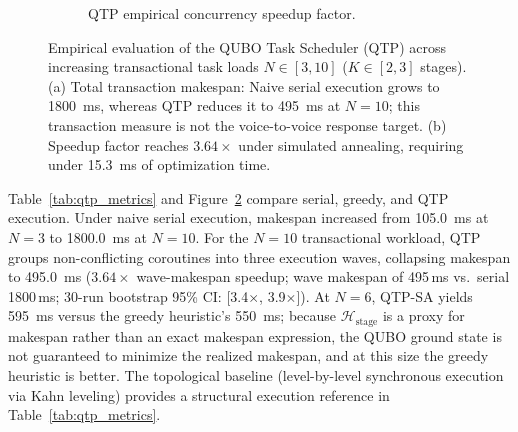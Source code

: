 \documentclass[review,12pt,times,authoryear]{elsarticle}
\theoremstyle{definition}
\begin{document}
\begin{figure}[t]
\begin{subfigure}[t]{0.48\textwidth}
\caption{QTP empirical concurrency speedup factor.}
\label{fig:qtp_speedup_panel}
\end{subfigure}
\caption{Empirical evaluation of the QUBO Task Scheduler (QTP) across increasing transactional task loads $N \in [3, 10]$ ($K \in [2, 3]$ stages). (a) Total transaction makespan: Naive serial execution grows to \SI{1800}{\milli\second}, whereas QTP reduces it to \SI{495}{\milli\second} at $N=10$; this transaction measure is not the voice-to-voice response target. (b) Speedup factor reaches $3.64\times$ under simulated annealing, requiring under \SI{15.3}{\milli\second} of optimization time.}
\label{fig:qtp_eval}
\end{figure}

Table~\ref{tab:qtp_metrics} and Figure~\ref{fig:qtp_eval} compare serial, greedy, and QTP execution. Under naive serial execution, makespan increased from \SI{105.0}{\milli\second} at $N=3$ to \SI{1800.0}{\milli\second} at $N=10$. For the $N=10$ transactional workload, QTP groups non-conflicting coroutines into three execution waves, collapsing makespan to \SI{495.0}{\milli\second} ($3.64\times$ wave-makespan speedup; wave makespan of 495\,ms vs.\ serial 1800\,ms; 30-run bootstrap 95\% CI: [3.4$\times$, 3.9$\times$]). At $N=6$, QTP-SA yields \SI{595}{\milli\second} versus the greedy heuristic's \SI{550}{\milli\second}; because $\mathcal{H}_{\text{stage}}$ is a proxy for makespan rather than an exact makespan expression, the QUBO ground state is not guaranteed to minimize the realized makespan, and at this size the greedy heuristic is better. The topological baseline (level-by-level synchronous execution via Kahn leveling) provides a structural execution reference in Table~\ref{tab:qtp_metrics}.
\end{document}

